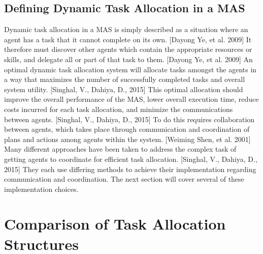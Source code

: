 \documentclass[12pt,letterpaper,onecolumn]{article}
\begin{document}
	\subsection{Defining Dynamic Task Allocation in a MAS}
	Dynamic task allocation in a MAS is simply described as  a situation where an agent has a task that it cannot complete on its own. [Dayong Ye, et al. 2009] It therefore must discover other agents which contain the appropriate resources or skills, and delegate all or part of that task to them. [Dayong Ye, et al. 2009] An optimal dynamic task allocation system will allocate tasks amongst the agents in a way that maximizes the number of successfully completed tasks and overall system utility. [Singhal, V., Dahiya, D., 2015] This optimal allocation should improve the overall performance of the MAS, lower overall execution time, reduce costs incurred for each task allocation, and minimize the communications between agents. [Singhal, V., Dahiya, D., 2015] To do this requires collaboration between agents, which takes place through communication and coordination of plans and actions among agents within the system. [Weiming Shen, et al. 2001] Many different approaches have been taken to address the complex task of getting agents to coordinate for efficient task allocation. [Singhal, V., Dahiya, D., 2015] They each use differing methods to achieve their implementation regarding communication and coordination. The next section will cover several of these implementation choices.
	\section{Comparison of Task Allocation Structures}
\end{document}
